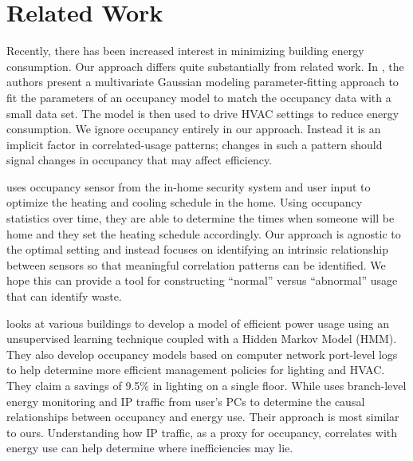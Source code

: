 \section{Related Work}
Recently, there has been increased interest in minimizing building energy consumption.  Our approach
differs quite substantially from related work.
In \cite{occmodels_buildsys11}, the authors present a multivariate Gaussian modeling parameter-fitting 
approach to fit the parameters of an occupancy model to match the occupancy data with a small data set.  
The model is then used to drive HVAC settings to reduce energy consumption.  We ignore occupancy entirely 
in our approach.  Instead it is an implicit factor in correlated-usage patterns; changes in such a pattern 
should signal changes in occupancy that may affect efficiency.

\cite{kaminthermo} uses occupancy sensor from the in-home security system and user input to
optimize the heating and cooling schedule in the home.  Using occupancy statistics over time, they
are able to determine the times when someone will be home and they set the heating schedule accordingly.
Our approach is agnostic to the optimal setting and instead focuses on identifying an intrinsic relationship
between sensors so that meaningful correlation patterns can be identified.  We hope this can provide
a tool for constructing ``normal'' versus ``abnormal'' usage that can identify waste.

\cite{Bellala_buildsys11} looks at various buildings to develop a model of efficient power usage using 
an unsupervised learning technique coupled with a Hidden Markov Model (HMM).  They also develop occupancy models based on
computer network port-level logs to help determine more efficient management policies for lighting and HVAC.  
They claim a savings of 9.5\% in lighting on a single floor.  While 
\cite{kim:buildsys2010} uses branch-level energy monitoring and IP traffic from user's PCs to determine the
causal relationships between occupancy and energy use.  Their approach is most similar to ours.  Understanding how IP 
traffic, as a proxy for occupancy, correlates with energy use can help determine where inefficiencies may lie.



